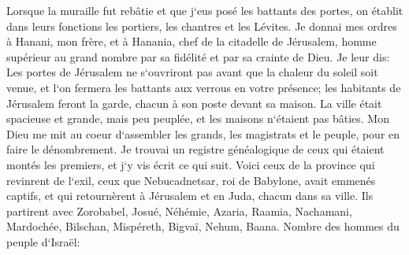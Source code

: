 \verse Lorsque la muraille fut rebâtie et que j`eus posé les battants des portes, on établit dans leurs fonctions les portiers, les chantres et les Lévites. 
\verse Je donnai mes ordres à Hanani, mon frère, et à Hanania, chef de la citadelle de Jérusalem, homme supérieur au grand nombre par sa fidélité et par sa crainte de Dieu. 
\verse Je leur dis: Les portes de Jérusalem ne s`ouvriront pas avant que la chaleur du soleil soit venue, et l`on fermera les battants aux verrous en votre présence; les habitants de Jérusalem feront la garde, chacun à son poste devant sa maison. 
\verse La ville était spacieuse et grande, mais peu peuplée, et les maisons n`étaient pas bâties. 
\verse Mon Dieu me mit au coeur d`assembler les grands, les magistrats et le peuple, pour en faire le dénombrement. Je trouvai un registre généalogique de ceux qui étaient montés les premiers, et j`y vis écrit ce qui suit. 
\verse Voici ceux de la province qui revinrent de l`exil, ceux que Nebucadnetsar, roi de Babylone, avait emmenés captifs, et qui retournèrent à Jérusalem et en Juda, chacun dans sa ville. 
\verse Ils partirent avec Zorobabel, Josué, Néhémie, Azaria, Raamia, Nachamani, Mardochée, Bilschan, Mispéreth, Bigvaï, Nehum, Baana. Nombre des hommes du peuple d`Israël: 
